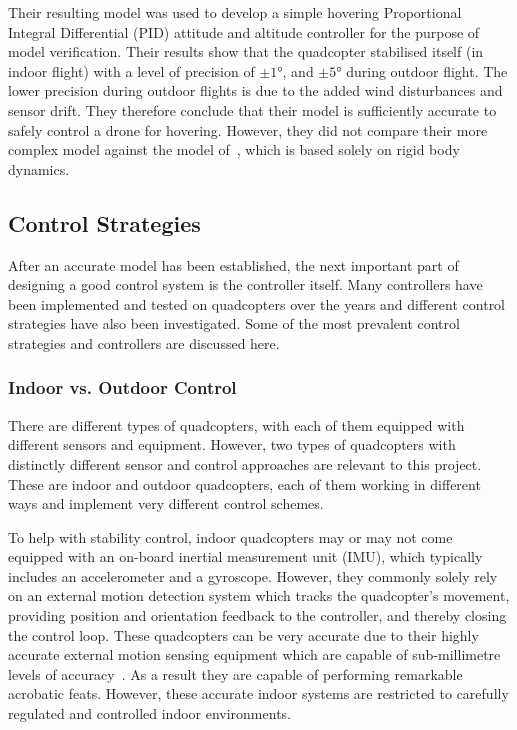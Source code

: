 Their resulting model was used to develop a simple hovering Proportional Integral Differential (PID) attitude and altitude controller for the purpose of model verification. Their results show that the quadcopter stabilised itself (in indoor flight) with a level of precision of $\pm\ang{1}$, and $\pm\ang{5}$ during outdoor flight. The lower precision during outdoor flights is due to the added wind disturbances and sensor drift. They therefore conclude that their model is sufficiently accurate to safely control a drone for hovering. However, they did not compare their more complex model against the model of~\citeauthor{hamel2002dynamic}, which is based solely on rigid body dynamics. 

\subsection{Control Strategies}

After an accurate model has been established, the next important part of designing a good control system is the controller itself. Many controllers have been implemented and tested on quadcopters over the years and different control strategies have also been investigated. Some of the most prevalent control strategies and controllers are discussed here.

\subsubsection{Indoor vs. Outdoor Control}

There are different types of quadcopters, with each of them equipped with different sensors and equipment. However, two types of quadcopters with distinctly different sensor and control approaches are relevant to this project. These are indoor and outdoor quadcopters, each of them working in different ways and implement very different control schemes. 

To help with stability control, indoor quadcopters may or may not come equipped with an on-board inertial measurement unit (IMU), which typically includes an accelerometer and a gyroscope. However, they commonly solely rely on an external motion detection system which tracks the quadcopter's movement, providing position and orientation feedback to the controller, and thereby closing the control loop. These quadcopters can be very accurate due to their highly accurate external motion sensing equipment which are capable of sub-millimetre levels of accuracy~\citep{richards1999measurement}. As a result they are capable of performing remarkable acrobatic feats. However, these accurate indoor systems are restricted to carefully regulated and controlled indoor environments.

